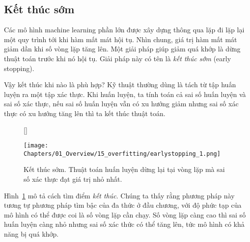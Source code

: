 \subsection{Kết thúc sớm}
Các mô hình machine learning phần lớn được xây dựng thông qua lặp đi lặp lại một
quy trình tới khi hàm mất mát hội tụ. Nhìn chung, giá trị hàm mất mát giảm dần
khi số vòng lặp tăng lên. Một giải pháp giúp giảm quá khớp là dừng thuật toán
trước khi nó hội tụ. Giải pháp này có tên là \textit{kết thúc sớm} (early stopping).

Vậy kết thúc khi nào là phù hợp? Kỹ thuật thường dùng là tách từ tập huấn luyện ra
một tập xác thực. Khi huấn luyện, ta tính toán cả sai số huấn luyện và sai số
xác thực, nếu sai số huấn luyện vẫn có xu hướng giảm nhưng sai số xác thực có xu
hướng tăng lên thì ta kết thúc thuật toán.



\begin{figure}[t]
[\FBwidth]
{\caption{
Kết thúc sớm. Thuật toán
huấn luyện dừng lại tại vòng lặp mà sai số xác thực đạt giá trị nhỏ nhất. }
\label{fig:15_earlystopping}}
{ %
\texttt{[image: Chapters/01\_Overview/15\_overfitting/earlystopping\_1.png]}
}
\end{figure}


Hình~\ref{fig:15_earlystopping} mô tả cách tìm điểm \textit{kết thúc}. Chúng ta
thấy rằng phương pháp này tương tự phương pháp tìm bậc của đa thức ở đầu chương,
với độ phức tạp của mô hình có thể được coi là số vòng lặp cần chạy. Số vòng lặp
càng cao thì sai số huấn luyện càng nhỏ nhưng sai số xác thức có thể tăng lên, tức mô hình có khả năng bị quá khớp.


